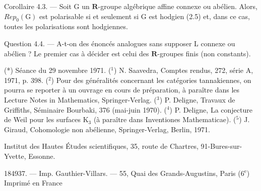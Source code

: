 Corollaire 4.3. --- Soit G un $\mathbf{R}$-groupe algébrique affine connexe ou
abélien. Alors, $Rep_0(\mathrm{G})$ est polarisable si et seulement si G est hodgien (2.5)
et, dans ce cas, toutes les polarisations sont hodgiennes.

Question 4.4. --- A-t-on des énoncés analogues sans supposer L connexe
ou abélien ? Le premier cas à décider est celui des $\mathbf{R}$-groupes finis (non
constants).

(*) Séance du 29 novembre 1971.
($^1$) N. Saavedra, Comptes rendus, 272, série A, 1971, p. 398.
($^2$) Pour des généralités concernant les catégories tannakiennes, on pourra se reporter
à un ouvrage en cours de préparation, à paraître dans les Lecture Notes in Mathematics,
Springer-Verlag.
($^3$) P. Deligne, Travaux de Griffiths, Séminaire Bourbaki, 376 (mai-juin 1970).
($^4$) P. Deligne, La conjecture de Weil pour les surfaces $\mathrm{K}_3$ (à paraître dans Inventiones
Mathematicae).
($^5$) J. Giraud, Cohomologie non abélienne, Springer-Verlag, Berlin, 1971.

Institut des Hautes Études scientifiques,
35, route de Chartres,
91-Bures-sur-Yvette, Essonne.

184937. --- Imp. Gauthier-Villars. --- 55, Quai des Grands-Augustins, Paris (6$^{\mathrm{e}}$)
Imprimé en France

